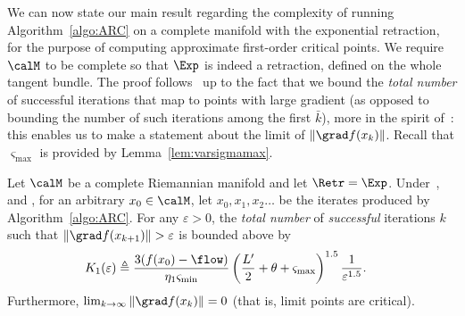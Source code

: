 We can now state our main result regarding the complexity of running Algorithm~\ref{algo:ARC} on a complete manifold with the exponential retraction, for the purpose of computing approximate first-order critical points. %
We require $\calM$ to be complete so that $\Exp$ is indeed a retraction, defined on the whole tangent bundle.
The proof follows~\citep[Thm.~2.5]{bcgmt} up to the fact that we bound the \emph{total number} of successful iterations that map to points with large gradient (as opposed to bounding the number of such iterations among the first $\bar k$), more in the spirit of~\citep{cartis2012complexity}: this enables us to make a statement about the limit of $\|\grad f(x_k)\|$.
Recall that $\varsigma_{\max}$ is provided by Lemma~\ref{lem:varsigmamax}.
\begin{theorem} \label{thm:masterboundSLipschitzHessian}
	Let $\calM$ be a complete Riemannian manifold and let $\Retr = \Exp$.
	Under~,  and , for an arbitrary $x_0 \in \calM$, let $x_0, x_1, x_2\ldots$ be the iterates produced by Algorithm~\ref{algo:ARC}.
	For any $\varepsilon > 0$, the \emph{total number} of \emph{successful} iterations $k$ such that $\|\grad f(x_{k+1})\| > \varepsilon$ is bounded above by
	\begin{align*}
		K_1(\varepsilon) & \triangleq \frac{3(f(x_0) - \flow)}{\eta_1 \varsigma_{\min}} \left(\frac{L'}{2}+\theta+\varsigma_{\max}\right)^{1.5} \frac{1}{\varepsilon^{1.5}}.
	\end{align*}
	Furthermore, $\lim_{k \to \infty} \|\grad f(x_k)\| = 0$ (that is, limit points are critical).
\end{theorem}
